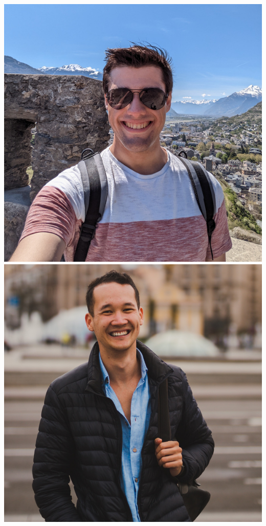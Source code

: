 \documentclass[aspectratio=169]{beamer}
\begin{document}
\begin{frame}
{            \includegraphics[width=0.1\textheight]{figures/students/george_carter.jpg}%
            \includegraphics[width=0.1\textheight]{figures/students/kilian_scheutwinkel.jpg}%
}
\end{frame}
\end{document}
